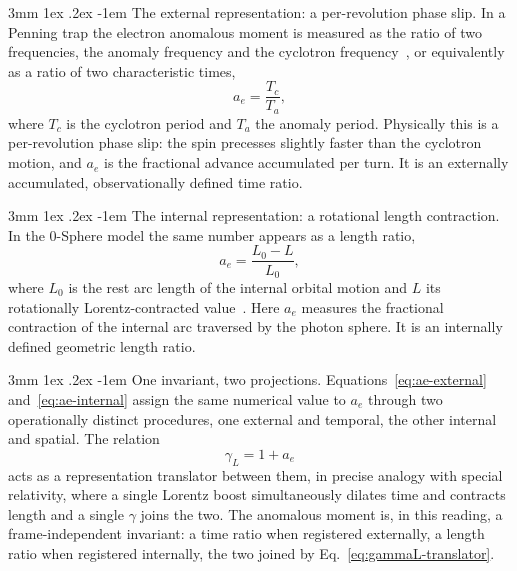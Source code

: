 \documentclass[%
 reprint, amsmath,amssymb, aps, prb, ]{revtex4-2}
\makeatletter
\numberwithin{equation}{section}
\renewcommand\paragraph{%
  \@startsection{paragraph}{4}{\z@}%
    {3mm \@plus 1ex \@minus .2ex}%
    {-1em}%
    {\normalfont\normalsize\itshape}}
\makeatother
\begin{document}
\paragraph{The external representation: a per-revolution phase slip.}
In a Penning trap the electron anomalous moment is measured as the ratio of two frequencies, the anomaly frequency and the cyclotron frequency~\cite{codata2022}, or equivalently as a ratio of two characteristic times,
\begin{equation}
a_e = \frac{T_c}{T_a},
\label{eq:ae-external}
\end{equation}
where $T_c$ is the cyclotron period and $T_a$ the anomaly period. Physically this is a per-revolution phase slip: the spin precesses slightly faster than the cyclotron motion, and $a_e$ is the fractional advance accumulated per turn. It is an externally accumulated, observationally defined time ratio.

\paragraph{The internal representation: a rotational length contraction.}
In the 0-Sphere model the same number appears as a length ratio,
\begin{equation}
a_e = \frac{L_0 - L}{L_0},
\label{eq:ae-internal}
\end{equation}
where $L_0$ is the rest arc length of the internal orbital motion and $L$ its rotationally Lorentz-contracted value~\cite{hanamura10,hanamura47}. Here $a_e$ measures the fractional contraction of the internal arc traversed by the photon sphere. It is an internally defined geometric length ratio.

\paragraph{One invariant, two projections.}
Equations~\eqref{eq:ae-external} and~\eqref{eq:ae-internal} assign the same numerical value to $a_e$ through two operationally distinct procedures, one external and temporal, the other internal and spatial. The relation
\begin{equation}
\gamma_L = 1 + a_e
\label{eq:gammaL-translator}
\end{equation}
acts as a representation translator between them, in precise analogy with special relativity, where a single Lorentz boost simultaneously dilates time and contracts length and a single $\gamma$ joins the two. The anomalous moment is, in this reading, a frame-independent invariant: a time ratio when registered externally, a length ratio when registered internally, the two joined by Eq.~\eqref{eq:gammaL-translator}.
\end{document}
